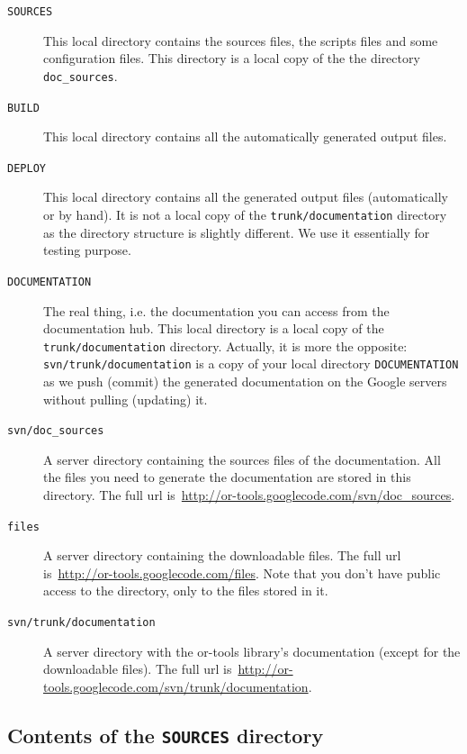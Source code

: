 \documentclass[a4paper,10pt]{article}
\newcommand{\code}[1]{\texttt{#1}}
\begin{document}
\begin{description}
 \item[\code{SOURCES}] This local directory contains the sources files, the scripts files and some configuration files. This directory is a local copy of the the directory \code{doc\_sources}.
 \item[\code{BUILD}] This local directory contains all the automatically generated output files. 
 \item[\code{DEPLOY}]  This local directory contains all the generated output files (automatically or by hand). It is not a local copy of the \code{trunk/documentation} directory as the directory structure is slightly different. We use it essentially for testing purpose.
 \item[\code{DOCUMENTATION}] The real thing, i.e. the documentation you can access from the documentation hub. This local directory is a local copy of the \code{trunk/documentation} directory. Actually, it is more the opposite: \code{svn/trunk/documentation} is a copy of your local directory \code{DOCUMENTATION} as we push (commit) the generated documentation on the Google servers without pulling (updating) it.
 \item[\code{svn/doc\_sources}] A server directory containing the sources files of the documentation. All the files you need to generate the documentation are stored in this directory. The full url is~\href{http://or-tools.googlecode.com/svn/doc\_sources}{http://or-tools.googlecode.com/svn/doc\_sources}.
 \item[\code{files}] A server directory containing the downloadable files. The full url is~\href{http://or-tools.googlecode.com/files}{http://or-tools.googlecode.com/files}. Note that you don't have public access to the directory, only to the files stored in it.
 \item[\code{svn/trunk/documentation}] A server directory with the or-tools library's documentation (except for the downloadable files). The full url is~\href{http://or-tools.googlecode.com/svn/trunk/documentation}{http://or-tools.googlecode.com/svn/trunk/documentation}.
\end{description}


\subsection{Contents of the \code{SOURCES} directory}
\label{doc_content}
\end{document}
